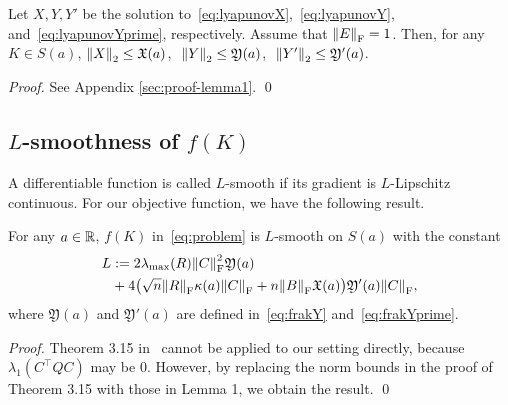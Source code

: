 \begin{lemma}\label{lem:xybound}
  Let $X, Y, Y'$ be the solution to~\eqref{eq:lyapunovX},~\eqref{eq:lyapunovY}, and~\eqref{eq:lyapunovYprime}, respectively.
  Assume that $\norm{E}_\mathrm{F} = 1$.
  Then, for any $K\in S(a)$,
    $\norm{X}_2  \leq \mathfrak{X}(a)$,\,\,
    $\norm{Y}_2  \leq \mathfrak{Y}(a)$,\,\, 
    $\norm{Y'}_2 \leq \mathfrak{Y}'(a)$.%
\end{lemma}

\begin{proof}
See Appendix \ref{sec:proof-lemma1}. \qed
\end{proof}

\subsection{$L$-smoothness of $f(K)$ }

A differentiable function is called $L$-smooth if its gradient is $L$-Lipschitz continuous.
For our objective function, we have the following result.
\begin{theorem}
  For any $a\in \mathbb{R}$, $f(K)$ in~\eqref{eq:problem} is $L$-smooth on $S(a)$ with the constant 
  \begin{align}
    L & := 2\lambda_{\max}(R)\norm{C}_\mathrm{F}^2\mathfrak{Y}(a) \label{eq:L}\\
    &+4\qty(\sqrt{n}\norm{R}_\mathrm{F}\kappa(a)\norm{C}_\mathrm{F}+n\norm{B}_\mathrm{F} \mathfrak{X}(a)) \mathfrak{Y}'(a) \norm{C}_\mathrm{F},\nonumber
  \end{align}
  where $\mathfrak{Y}(a)$ and $\mathfrak{Y}'(a)$ are defined in~\eqref{eq:frakY} and~\eqref{eq:frakYprime}. %
\end{theorem}
\begin{proof}
Theorem 3.15 in~\cite{fatkhullin2021optimizing} cannot be applied to our setting directly, because $\lambda_1(C^\top QC)$ may be $0$.
However, by replacing the norm bounds in the proof of Theorem 3.15 with those in Lemma 1, we obtain the result. \qed
\end{proof}

% 